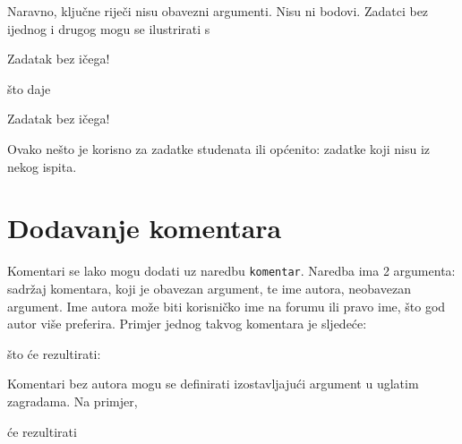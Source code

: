 \documentclass{studosi-workbook}
\begin{document}
    Naravno, ključne riječi nisu obavezni argumenti. Nisu ni bodovi. Zadatci bez ijednog i drugog mogu se ilustrirati s
    
    \begin{kod}
   	\begin{zadatak}
   		Zadatak bez ičega!
   	\end{zadatak}
    \end{kod}
    
    što daje
    
    \begin{zadatak}
    	Zadatak bez ičega!
    \end{zadatak}
    \vspace*{20pt}
    
    Ovako nešto je korisno za zadatke studenata ili općenito: zadatke koji nisu iz nekog ispita.
    
    \section{Dodavanje komentara}
    Komentari se lako mogu dodati uz naredbu \texttt{komentar}. Naredba ima 2 argumenta: sadržaj komentara, koji je obavezan argument, te ime autora, neobavezan argument. Ime autora može biti korisničko ime na forumu ili pravo ime, što god autor više preferira. Primjer jednog takvog komentara je sljedeće:
    
    \begin{kod}
    \end{kod}

	što će rezultirati:
	

	\vspace*{8pt}

	Komentari bez autora mogu se definirati izostavljajući argument u uglatim zagradama. Na primjer,
	
	\begin{kod}
	\end{kod}

	će rezultirati
	

	\vspace*{8pt}
\end{document}
